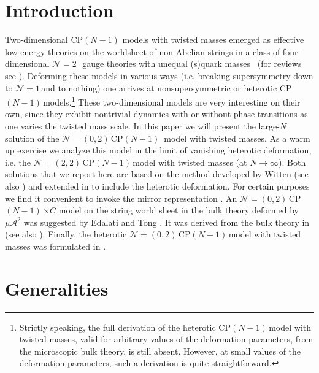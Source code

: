 \documentclass[epsfig,12pt]{article}
\newcommand{\ntwo}{${\mathcal N}=2\,$}
\newcommand{\none}{${\mathcal N}=1\,$}
\newcommand{\ntt}{${\mathcal N}=(2,2)\,$}
\newcommand{\nzt}{${\mathcal N}=(0,2)\,$}
\newcommand{\cpn}{CP$(N-1)\,$}
\newcommand{\ca}{{\mathcal A}}
\begin{document}
\newpage


\section{Introduction}

Two-dimensional  CP$(N-1)$ models with twisted masses
emerged as effective low-energy theories on
the worldsheet of non-Abelian strings in a class of 
four-dimensional \ntwo\, gauge theories with unequal (s)quark 
masses~\cite{ABEKY,SYmon,HT2} (for reviews see  \cite{Trev}). 
Deforming these models in various ways (i.e. breaking supersymmetry down to \none and to nothing)
one arrives at nonsupersymmetric or heterotic \cpn models.\footnote{
Strictly speaking, the full derivation of the
heterotic \cpn model with twisted masses, valid for arbitrary values of
the deformation parameters,  from the microscopic bulk theory, is still absent.
However, at small values of the deformation parameters,
such a derivation is quite straightforward.} These two-dimensional models are very 
interesting on their own,
since they exhibit nontrivial dynamics with or without phase transitions 
as one varies the twisted mass scale.
In this paper we will present the large-$N$ solution of the \nzt \mbox{\cpn}  model with twisted
masses. As a warm up exercise we analyze this model in the limit of vanishing heterotic deformation,
i.e. the \ntt \cpn model with twisted masses (at $N\to\infty$). Both solutions 
that we report here are based on the method developed by Witten
\cite{W79,W93} (see also \cite{dadvl}) and extended in \cite{SYhet} to include the heterotic deformation.
For certain purposes we find it convenient to invoke the mirror
representation \cite{MR1,MR2}. An \nzt \cpn$\times C$
model on the string world sheet in the bulk theory deformed by $\mu\ca^2$
was suggested by Edalati and Tong \cite{EdTo}.
It was derived from the bulk theory in \cite{SY1} (see also \cite{BSY1,BSY2}).
Finally, the heterotic \nzt  \cpn model with twisted masses was formulated in \cite{BSY3}.

\section{Generalities}
\end{document}
